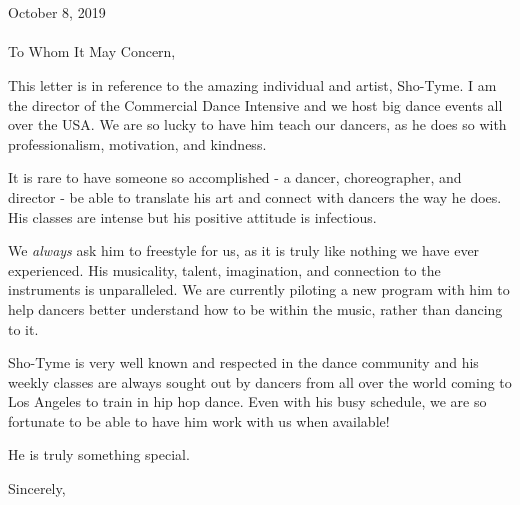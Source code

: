 \documentclass[11pt,a4paper]{letter} %
\def\opening#1{\thispagestyle{empty}
{\centering\fromaddress \vspace{0.519in} \\ %
\hspace*{\longindentation}\hspace*{\fill}\par} %
{\raggedright \toname \\ \toaddress \par} %
\vspace{0.4in} %
\noindent #1 %
}
\begin{document}

\begin{letter}
{}

%

\opening{October 8, 2019\\ \\ To Whom It May Concern, }

This letter is in reference to the amazing individual and artist, Sho-Tyme. I am the director of the Commercial Dance Intensive and we host big dance events all over the USA. We are so lucky to have him teach our dancers, as he does so with professionalism, motivation, and kindness.

It is rare to have someone so accomplished - a dancer, choreographer, and director - be able to translate his art and connect with dancers the way he does. His classes are intense but his positive attitude is infectious.

We \textit{always} ask him to freestyle for us, as it is truly like nothing we have ever experienced. His musicality, talent, imagination, and connection to the instruments is unparalleled. We are currently piloting a new program with him to help dancers better understand how to be within the music, rather than dancing to it.

Sho-Tyme is very well known and respected in the dance community and his weekly classes are always sought out by dancers from all over the world coming to Los Angeles to train in hip hop dance. Even with his busy schedule, we are so fortunate to be able to have him work with us when available!

He is truly something special.

\closing{Sincerely,\\[2mm]
}


\end{letter}
\end{document}
